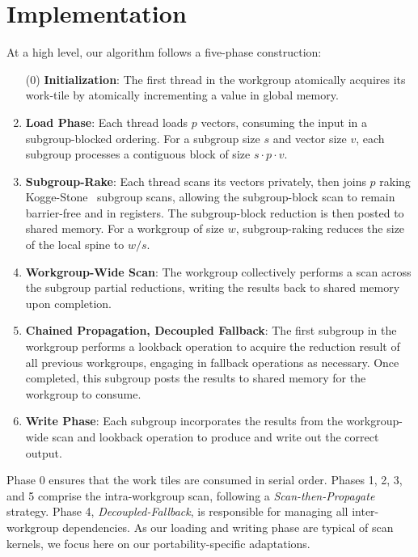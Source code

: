 \documentclass[sigconf]{acmart}
\begin{document}
\section{Implementation}
At a high level, our algorithm follows a five-phase construction:
\begin{enumerate}
  \item[(0)] \textbf {Initialization}: The first thread in the workgroup atomically acquires its work-tile by atomically incrementing a value in global memory.
  \item \textbf{Load Phase}: Each thread loads $p$ vectors, consuming the input in a subgroup-blocked ordering. For a subgroup size $s$ and vector size $v$, each subgroup processes a contiguous block of size $s \cdot p \cdot v$.
  \item \textbf{Subgroup-Rake}: Each thread scans its vectors privately, then joins $p$ raking Kogge-Stone~\cite{} subgroup scans,
  allowing the subgroup-block scan to remain barrier-free and in registers. The subgroup-block reduction is then posted to shared memory. For a workgroup of size $w$, subgroup-raking reduces the size of the local spine to $w/s$.
  \item \textbf{Workgroup-Wide Scan}: The workgroup collectively performs a scan across the subgroup partial reductions, writing the results back to shared memory upon completion.
  \item \textbf{Chained Propagation, Decoupled Fallback}: The first subgroup in the workgroup performs a lookback operation to acquire the reduction result of all previous workgroups, engaging in fallback operations as necessary. Once completed, this subgroup posts the results to shared memory for the workgroup to consume.
  \item \textbf{Write Phase}: Each subgroup incorporates the results from the workgroup-wide scan and lookback operation to produce and write out the correct output.
\end{enumerate}
Phase 0 ensures that the work tiles are consumed in serial order. Phases 1, 2, 3, and 5 comprise the intra-workgroup scan, following a \emph{Scan-then-Propagate} strategy. Phase 4, \emph{Decoupled-Fallback}, is responsible for managing all inter-workgroup dependencies. As our loading and writing phase are typical of scan kernels, we focus here on our portability-specific adaptations.
\end{document}
